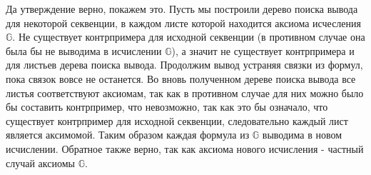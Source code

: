 \documentclass[a4paper,12pt]{article}
\begin{document}
\begin{Solution}
Да утверждение верно, покажем это. Пусть мы построили дерево поиска вывода для некоторой секвенции, в каждом листе которой находится аксиома исчесления $\mathbb{G}$. Не существует контрпримера для исходной секвенции (в противном случае она была бы не выводима в исчислении $\mathbb{G}$), а значит не существует контрпримера и для листьев дерева поиска вывода. Продолжим вывод устраняя связки из формул, пока связок вовсе не останется. Во вновь полученном дереве поиска вывода все листья соответствуют аксиомам, так как в противном случае для них можно было бы составить контрпример, что невозможно, так как это бы означало, что существует контрпример для исходной секвенции, следовательно каждый лист является аксимомой. Таким образом каждая формула из $\mathbb{G}$ выводима в новом исчислении. Обратное также верно, так как аксиома нового исчисления - частный случай аксиомы $\mathbb{G}$.
\end{Solution}
\end{document}

